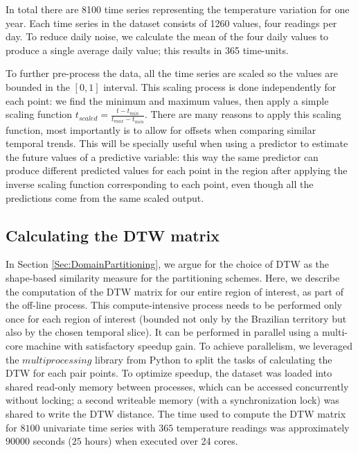 In total there are 8100 time series representing the temperature variation for one year. Each time series in the dataset consists of 1260 values, four readings per day. To reduce daily noise, we calculate the mean of the four daily values to produce a single average daily value; this results in 365 time-units. 

To further pre-process the data, all the time series are scaled so the values are bounded in the $[0, 1]$ interval. This scaling process is done independently for each point: we find the minimum and maximum values, then apply a simple scaling function $ t_{scaled} = \frac{t - t_{min}}{t_{max} - t_{min}}$. There are many reasons to apply this scaling function, most importantly is to allow for offsets when comparing similar temporal trends. This will be specially useful when using a predictor to estimate the future values of a predictive variable: this way the same predictor can produce different predicted values for each point in the region after applying the inverse scaling function corresponding to each point, even though all the predictions come from the same scaled output.

\subsection{Calculating the DTW matrix}
\label{Sec:Calculating_DTW}

In Section \ref{Sec:DomainPartitioning}, we argue for the choice of DTW as the shape-based similarity measure for the partitioning schemes. Here, we describe the computation of the DTW matrix for our entire region of interest, as part of the off-line process. This compute-intensive process needs to be performed only once for each region of interest (bounded not only by the Brazilian territory but also by the chosen temporal slice). It can be performed in parallel using a multi-core machine with satisfactory speedup gain. To achieve parallelism, we leveraged the $multiprocessing$ library from Python to split the tasks of calculating the DTW for each pair points. To optimize speedup, the dataset was loaded into shared read-only memory between processes, which can be accessed concurrently without locking; a second writeable memory (with a synchronization lock) was shared to write the DTW distance. The time used to compute the DTW matrix for $8100$ univariate time series with $365$ temperature readings was approximately $90000$ seconds ($25$ hours) when executed over 24 cores.

